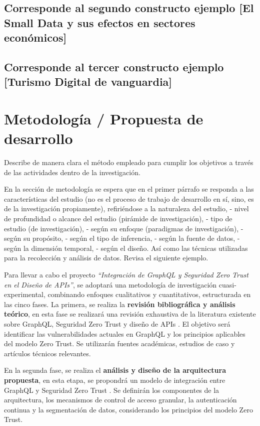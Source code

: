 \documentclass[12pt]{article}
\begin{document}
{\color{gray} \lipsum[1-3]}

\subsection{Corresponde al segundo constructo ejemplo [El Small Data y sus efectos en sectores económicos]}
{\color{gray} \lipsum[1-3]}

\subsection{Corresponde al tercer constructo ejemplo [Turismo Digital de vanguardia]}
{\color{gray} \lipsum[1-3]}


\section{Metodología / Propuesta de desarrollo}
{\color{magenta}Describe de manera clara el método empleado para cumplir los objetivos a través de las actividades dentro de la investigación.}

En la sección de metodología se espera que en el primer párrafo se responda a las características del estudio (no es el proceso de trabajo de desarrollo en sí, sino, es de la investigación propiamente), refiriéndose a la naturaleza del estudio, - nivel de profundidad o alcance del estudio (pirámide de investigación), - tipo de estudio (de investigación), - según su enfoque (paradigmas de investigación), - según su propósito, - según el tipo de inferencia, - según la fuente de datos, - según la dimensión temporal, - según el diseño. Así como las técnicas utilizadas para la recolección y análisis de datos. Revisa el siguiente ejemplo.

{\color{blue}Para llevar a cabo el proyecto \textit{“Integración de GraphQL y Seguridad Zero Trust en el Diseño de APIs”}, se adoptará una metodología de investigación cuasi-experimental, combinando enfoques cualitativos y cuantitativos, estructurada en las cinco fases. La primera, se realiza la \textbf{revisión bibliográfica y análisis teórico}, en esta fase se realizará una revisión exhaustiva de la literatura existente sobre GraphQL, Seguridad Zero Trust y diseño de APIs \parencite{guerrero2025integracion}. El objetivo será identificar las vulnerabilidades actuales en GraphQL y los principios aplicables del modelo Zero Trust. 
Se utilizarán fuentes académicas, estudios de caso y artículos técnicos relevantes. }

En la segunda fase, se realiza el \textbf{análisis y diseño de la arquitectura propuesta}, en esta etapa, se propondrá un modelo de integración entre GraphQL y Seguridad Zero Trust \parencite{Llerena-Izquierdo2024}. Se definirán los componentes de la arquitectura, los mecanismos de control de acceso granular, la autenticación continua y la segmentación de datos, considerando los principios del modelo Zero Trust. 
\end{document}
